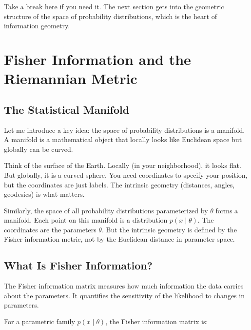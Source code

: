 \vspace{2em}

Take a break here if you need it. The next section gets into the geometric structure of the space of probability distributions, which is the heart of information geometry.

\vspace{2em}

\section{Fisher Information and the Riemannian Metric}

\subsection{The Statistical Manifold}

Let me introduce a key idea: the space of probability distributions is a manifold. A manifold is a mathematical object that locally looks like Euclidean space but globally can be curved.

Think of the surface of the Earth. Locally (in your neighborhood), it looks flat. But globally, it is a curved sphere. You need coordinates to specify your position, but the coordinates are just labels. The intrinsic geometry (distances, angles, geodesics) is what matters.

\vspace{1em}

Similarly, the space of all probability distributions parameterized by $\theta$ forms a manifold. Each point on this manifold is a distribution $p(x \mid \theta)$. The coordinates are the parameters $\theta$. But the intrinsic geometry is defined by the Fisher information metric, not by the Euclidean distance in parameter space.

\vspace{1.5em}

\subsection{What Is Fisher Information?}

The Fisher information matrix measures how much information the data carries about the parameters. It quantifies the sensitivity of the likelihood to changes in parameters.

For a parametric family $p(x \mid \theta)$, the Fisher information matrix is:


